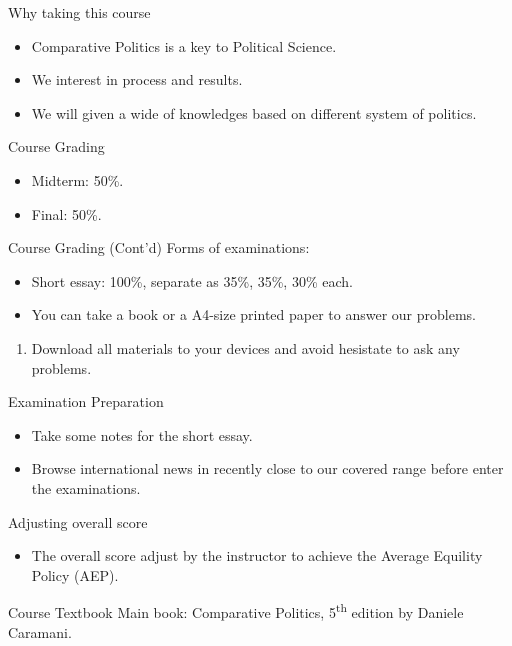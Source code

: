 \documentclass{beamer}
\begin{document}
\begin{frame}{Why taking this course}
\begin{itemize}
\item Comparative Politics is a key to Political Science.
\item We interest in process and results.
\item We will given a wide of knowledges based on different system of politics.
\end{itemize}
\end{frame}
\begin{frame}{Course Grading}
\begin{itemize}
\item Midterm: 50\%.
\item Final: 50\%.
\end{itemize}
\end{frame}
\begin{frame}{Course Grading (Cont'd)}
Forms of examinations:
\begin{itemize}
\item Short essay: 100\%, separate as 35\%, 35\%, 30\% each.
\item You can take a book or a A4-size printed paper to answer our problems.
\end{itemize}
\begin{enumerate}
\item Download all materials to your devices and avoid hesistate to ask any problems.
\end{enumerate}
\end{frame}
\begin{frame}{Examination Preparation}
\begin{itemize}
\item Take some notes for the short essay.
\item Browse international news in recently close to our covered range before enter the examinations.
\end{itemize}
\begin{block}{Adjusting overall score}
\begin{itemize}
\item The overall score adjust by the instructor to achieve the Average Equility Policy (AEP).
\end{itemize}
\end{block}
\end{frame}
\begin{frame}{Course Textbook}
Main book: Comparative Politics, 5\textsuperscript{th} edition by Daniele Caramani. \\
\end{frame}
\end{document}
